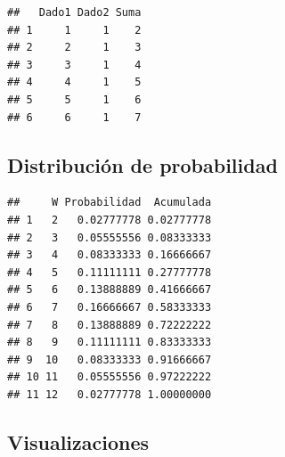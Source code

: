 \documentclass[
]{article}
\newenvironment{Shaded}{\begin{snugshade}}{\end{snugshade}}
\newcommand{\AttributeTok}[1]{\textcolor[rgb]{0.13,0.29,0.53}{#1}}
\newcommand{\FunctionTok}[1]{\textcolor[rgb]{0.13,0.29,0.53}{\textbf{#1}}}
\newcommand{\NormalTok}[1]{#1}
\newcommand{\OtherTok}[1]{\textcolor[rgb]{0.56,0.35,0.01}{#1}}
\newcommand{\SpecialCharTok}[1]{\textcolor[rgb]{0.81,0.36,0.00}{\textbf{#1}}}
\begin{document}
\begin{verbatim}
##   Dado1 Dado2 Suma
## 1     1     1    2
## 2     2     1    3
## 3     3     1    4
## 4     4     1    5
## 5     5     1    6
## 6     6     1    7
\end{verbatim}

\subsection{Distribución de
probabilidad}\label{distribuciuxf3n-de-probabilidad}

\begin{Shaded}
\end{Shaded}

\begin{verbatim}
##     W Probabilidad  Acumulada
## 1   2   0.02777778 0.02777778
## 2   3   0.05555556 0.08333333
## 3   4   0.08333333 0.16666667
## 4   5   0.11111111 0.27777778
## 5   6   0.13888889 0.41666667
## 6   7   0.16666667 0.58333333
## 7   8   0.13888889 0.72222222
## 8   9   0.11111111 0.83333333
## 9  10   0.08333333 0.91666667
## 10 11   0.05555556 0.97222222
## 11 12   0.02777778 1.00000000
\end{verbatim}

\subsection{Visualizaciones}\label{visualizaciones}
\end{document}
